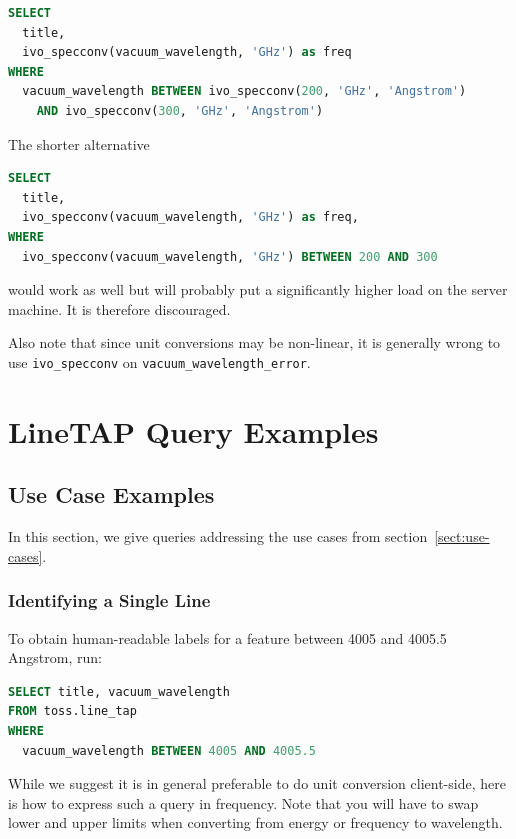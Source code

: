 \documentclass[11pt,a4paper]{ivoa}
\begin{document}
\begin{lstlisting}[language=SQL]
SELECT
  title,
  ivo_specconv(vacuum_wavelength, 'GHz') as freq
WHERE
  vacuum_wavelength BETWEEN ivo_specconv(200, 'GHz', 'Angstrom')
    AND ivo_specconv(300, 'GHz', 'Angstrom')
\end{lstlisting}

The shorter alternative

\begin{lstlisting}[language=SQL]
SELECT
  title,
  ivo_specconv(vacuum_wavelength, 'GHz') as freq,
WHERE
  ivo_specconv(vacuum_wavelength, 'GHz') BETWEEN 200 AND 300
\end{lstlisting}

\noindent would work as well but will probably put a significantly higher load on
the server machine.  It is therefore discouraged.

Also note that since unit conversions may be non-linear, it is generally
wrong to use \texttt{ivo\_specconv} on
\texttt{vacuum\_wavelength\_error}.


\section{LineTAP Query Examples}

\subsection{Use Case Examples}

In this section, we give queries addressing the use cases from
section~\ref{sect:use-cases}.

\subsubsection{Identifying a Single Line}

To obtain human-readable labels for a feature between 4005 and 4005.5
Angstrom, run:

\begin{lstlisting}[language=SQL]
SELECT title, vacuum_wavelength
FROM toss.line_tap
WHERE
  vacuum_wavelength BETWEEN 4005 AND 4005.5
\end{lstlisting}

While we suggest it is in general preferable to do unit conversion
client-side, here is how to express such a query in
frequency.
Note that you will have to swap lower and upper limits when converting
from energy or frequency to wavelength.
\end{document}
